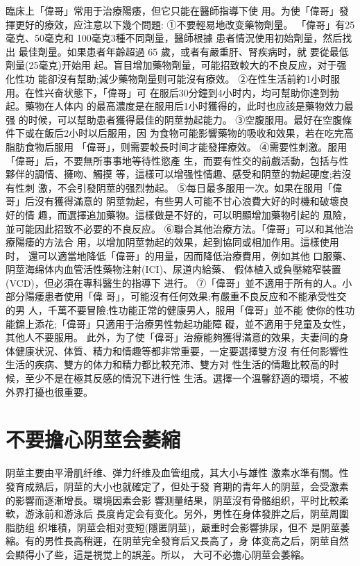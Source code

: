 \documentclass[12pt,UTF8]{ctexbook}
\begin{document}
臨床上「偉哥」常用于治療陽痿，但它只能在醫師指導下使
用。为使「偉哥」發揮更好的療效，应注意以下幾个問題:
①不要輕易地改变藥物劑量。
「偉哥」有25毫克、50毫克和
100毫克3種不同劑量，醫師根據
患者情況使用初始劑量，然后找出
最佳劑量。如果患者年齡超過 65
歲，或者有嚴重肝、腎疾病时，就
要從最低劑量(25毫克)开始用
起。盲目增加藥物劑量，可能招致較大的不良反应，对于强化性功
能卻沒有幫助;減少藥物劑量则可能沒有療效。
②在性生活前約1小时服用。在性兴奋状態下，「偉哥」可
在服后30分鐘到4小时内，均可幫助你達到勃起。藥物在人体内
的最高濃度是在服用后1小时獲得的，此时也应該是藥物效力最强
的时候，可以幫助患者獲得最佳的阴莖勃起能力。
③空腹服用。最好在空腹條件下或在飯后2小时以后服用，因
为食物可能影響藥物的吸收和效果，若在吃完高脂肪食物后服用
「偉哥」，则需要較長时间才能發揮療效。
④需要性刺激。服用「偉哥」后，不要無所事事地等待性慾產
生，而要有性交的前戲活動，包括与性夥伴的調情、擁吻、觸摸
等，這樣可以增强性情趣、感受和阴莖的勃起硬度;若沒有性刺
激，不会引發阴莖的强烈勃起。
⑤每日最多服用一次。如果在服用「偉哥」后沒有獲得滿意的
阴莖勃起，有些男人可能不甘心浪費大好的时機和破壞良好的情
趣，而選擇追加藥物。這樣做是不好的，可以明顯增加藥物引起的
風險，並可能因此招致不必要的不良反应。
⑥聯合其他治療方法。「偉哥」可以和其他治療陽痿的方法合
用，以增加阴莖勃起的效果，起到協同或相加作用。這樣使用时，
還可以適當地降低「偉哥」的用量，因而降低治療費用，例如其他
口服藥、阴莖海绵体内血管活性藥物注射(ICI)、尿道内給藥、
假体植入或負壓縮窄裝置(VCD)，但必須在專科醫生的指導下
进行。
⑦「偉哥」並不適用于所有的人。小部分陽痿患者使用「偉
哥」，可能沒有任何效果;有嚴重不良反应和不能承受性交的男
人，千萬不要冒險;性功能正常的健康男人，服用「偉哥」並不能
使你的性功能錦上添花;「偉哥」只適用于治療男性勃起功能障
礙，並不適用于兒童及女性，其他人不要服用。
此外，为了使「偉哥」治療能夠獲得滿意的效果，夫妻间的身
体健康状況、体質、精力和情趣等都非常重要，一定要選擇雙方沒
有任何影響性生活的疾病、雙方的体力和精力都比較充沛、雙方对
性生活的情趣比較高的时候，至少不是在極其反感的情況下进行性
生活。選擇一个溫馨舒適的環境，不被外界打擾也很重要。
\section{不要擔心阴莖会萎縮}
阴莖主要由平滑肌纤维、弹力纤维及血管组成，其大小与雄性
激素水準有關。性發育成熟后，阴莖的大小也就確定了，但处于發
育期的青年人的阴莖，会受激素的影響而逐漸增長。環境因素会影
響测量结果，阴莖沒有骨骼组织，平时比較柔軟，游泳前和游泳后
長度肯定会有变化。另外，男性在身体發胖之后，阴莖周圍脂肪组
织堆積，阴莖会相对变短(隱匿阴莖)，嚴重时会影響排尿，但不
是阴莖萎縮。有的男性長高稍遲，在阴莖完全發育后又長高了，身
体变高之后，阴莖自然会顯得小了些，這是視觉上的誤差。所以，
大可不必擔心阴莖会萎縮。
\end{document}
